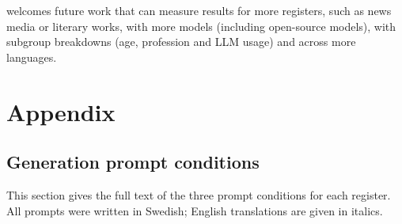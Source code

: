 \documentclass[thesis]{cluu}
\begin{document}
welcomes future work that can measure results for more registers, such as news media or literary works, with more models (including open-source models), with subgroup breakdowns (age, profession and LLM usage) and across more languages.




\printbibliography

\chapter{Appendix}

\section{Generation prompt conditions}
\label{app:prompts}

This section gives the full text of the three prompt conditions for each
register. All prompts were
written in Swedish; English translations are given in italics.
\end{document}
